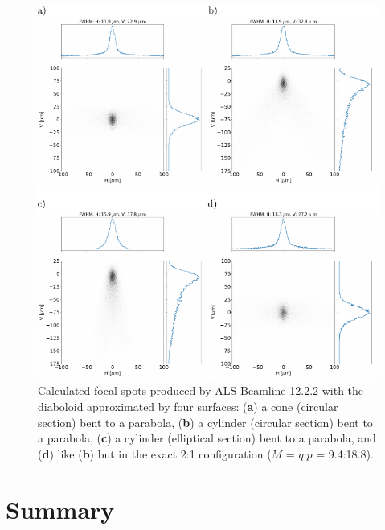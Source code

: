 \documentclass{iucr}       %
\begin{document}
\begin{figure}\label{fig:finalcomparison}
\includegraphics[width=1.0\textwidth]{figures/fig9.pdf}
% 


\caption{Calculated focal spots produced by ALS Beamline 12.2.2 with the diaboloid approximated by four surfaces: (\textbf{a}) a cone (circular section) bent to a parabola, (\textbf{b}) a cylinder (circular section) bent to a parabola, (\textbf{c}) a cylinder (elliptical section) bent to a parabola, and (\textbf{d}) like (\textbf{b}) but in the exact 2:1 configuration ($M$ = $q$:$p$ = 9.4:18.8).}
\end{figure}

\section{Summary}
\label{sec:summary}
\end{document}
